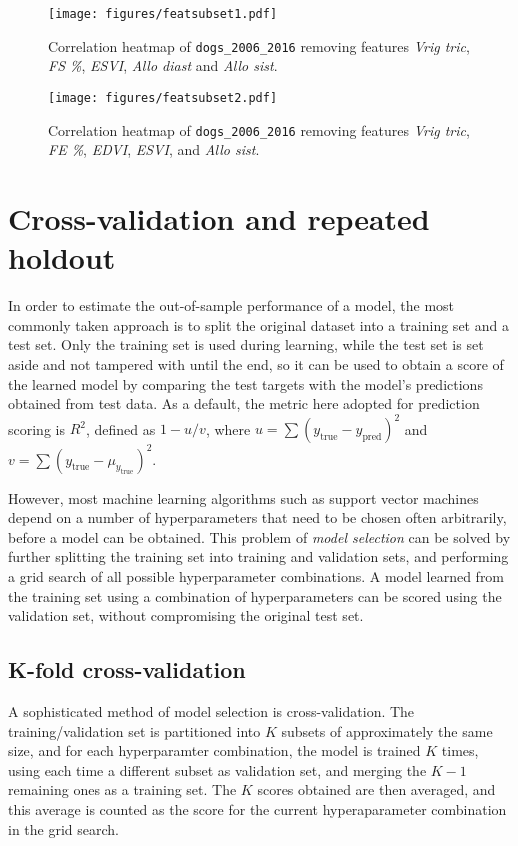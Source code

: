 \documentclass[12pt]{report}
\begin{document}
\begin{figure}[hp]
  \centering
  	\texttt{[image: figures/featsubset1.pdf]}
  \caption{Correlation heatmap of \texttt{dogs\_2006\_2016} removing features \textit{Vrig tric}, \textit{FS \%}, \textit{ESVI}, \textit{Allo diast} and \textit{Allo sist}.}
  \label{featsubset1}
  \vspace{0.7cm}
  \centering
  	\texttt{[image: figures/featsubset2.pdf]}
  \caption{Correlation heatmap of \texttt{dogs\_2006\_2016} removing features \textit{Vrig tric}, \textit{FE \%}, \textit{EDVI}, \textit{ESVI}, and \textit{Allo sist}.}
  \label{featsubset2}
\end{figure}

\section{Cross-validation and repeated holdout} \label{cvalreph}
In order to estimate the out-of-sample performance of a model, the most commonly taken approach is to split the original dataset into a training set and a test set. Only the training set is used during learning, while the test set is set aside and not tampered with until the end, so it can be used to obtain a score of the learned model by comparing the test targets with the model's predictions obtained from test data. As a default, the metric here adopted for prediction scoring is $R^2$, defined as $1 - u/v$, where $u = \sum(y_{\text{true}} - y_{\text{pred}})^2$ and $v = \sum(y_{\text{true}} - \mu_{y_{\text{true}}})^2$.

However, most machine learning algorithms such as support vector machines depend on a number of hyperparameters that need to be chosen often arbitrarily, before a model can be obtained. This problem of \textit{model selection} can be solved by further splitting the training set into training and validation sets, and performing a grid search of all possible hyperparameter combinations. A model learned from the training set using a combination of hyperparameters can be scored using the validation set, without compromising the original test set.

\subsection*{K-fold cross-validation}
A sophisticated method of model selection is cross-validation. The training/validation set is partitioned into $ K $ subsets of approximately the same size, and for each hyperparamter combination, the model is trained $ K $ times, using each time a different subset as validation set, and merging the $ K - 1 $ remaining ones as a training set. The $ K $ scores obtained are then averaged, and this average is counted as the score for the current hyperaparameter combination in the grid search.
\end{document}
